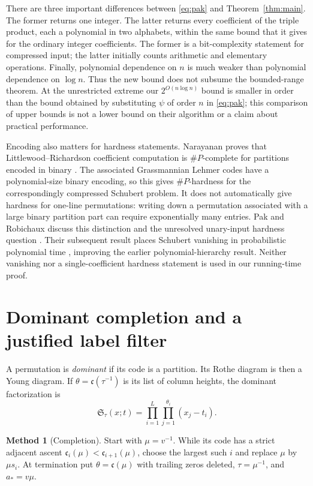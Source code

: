 \documentclass{amsart}
\theoremstyle{definition}
\newtheorem{method}[theorem]{Method}
\theoremstyle{remark}
\numberwithin{equation}{section}
\newcommand{\Sch}{\mathfrak S}
\newcommand{\code}{\mathfrak c}
\begin{document}
There are three important differences between \eqref{eq:pak} and
Theorem~\ref{thm:main}.
The former returns one integer.
The latter returns every coefficient of the triple product, each a
polynomial in two alphabets, within the same bound that it gives for
the ordinary integer coefficients.
The former is a bit-complexity statement for compressed input; the latter
initially counts arithmetic and elementary operations.
Finally, polynomial dependence on $n$ is much weaker than polynomial
dependence on $\log n$.
Thus the new bound does not subsume the bounded-range theorem.
At the unrestricted extreme our $2^{O(n\log n)}$ bound is smaller in
order than the bound obtained by substituting $\psi$ of order $n$
in \eqref{eq:pak}; this comparison of upper bounds is not a lower bound
on their algorithm or a claim about practical performance.

Encoding also matters for hardness statements.
Narayanan proves that Littlewood--Richardson coefficient computation is
$\#P$-complete for partitions encoded in binary
\cite{narayanan2006complexity}.
The associated Grassmannian Lehmer codes have a polynomial-size binary
encoding, so this gives $\#P$-hardness for the correspondingly compressed
Schubert problem.
It does not automatically give hardness for one-line permutations:
writing down a permutation associated with a large binary partition
part can require exponentially many entries.
Pak and Robichaux discuss this distinction and the unresolved
unary-input hardness question \cite{pak2024vanishing}.
Their subsequent result places Schubert vanishing in probabilistic
polynomial time \cite{pakrobichaux2025bpp}, improving the earlier
polynomial-hierarchy result.
Neither vanishing nor a single-coefficient hardness statement is used
in our running-time proof.

\section{Dominant completion and a justified label filter}\label{sec:completion}

A permutation is \emph{dominant} if its code is a partition.
Its Rothe diagram is then a Young diagram.
If $\theta=\code(\tau^{-1})$ is its list of column heights, the
dominant factorization is
\begin{equation}\label{eq:dominant}
 \Sch_\tau(x;t)=\prod_{i=1}^{L}\prod_{j=1}^{\theta_i}(x_j-t_i).
\end{equation}

\begin{method}[Completion]\label{method:completion}
Start with $\mu=v^{-1}$.
While its code has a strict adjacent ascent
$\code_i(\mu)<\code_{i+1}(\mu)$, choose the largest such $i$
and replace $\mu$ by $\mu s_i$.
At termination put $\theta=\code(\mu)$ with trailing zeros deleted,
$\tau=\mu^{-1}$, and $a_*=v\mu$.
\end{method}
\end{document}
